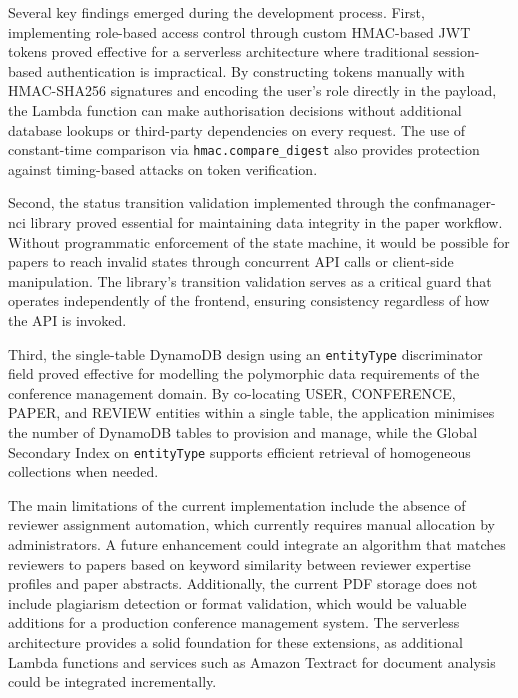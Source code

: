 \documentclass[conference]{IEEEtran}
\begin{document}
Several key findings emerged during the development process. First, implementing role-based access control through custom HMAC-based JWT tokens proved effective for a serverless architecture where traditional session-based authentication is impractical. By constructing tokens manually with HMAC-SHA256 signatures and encoding the user's role directly in the payload, the Lambda function can make authorisation decisions without additional database lookups or third-party dependencies on every request. The use of constant-time comparison via \texttt{hmac.compare\_digest} also provides protection against timing-based attacks on token verification.

Second, the status transition validation implemented through the confmanager-nci library proved essential for maintaining data integrity in the paper workflow. Without programmatic enforcement of the state machine, it would be possible for papers to reach invalid states through concurrent API calls or client-side manipulation. The library's transition validation serves as a critical guard that operates independently of the frontend, ensuring consistency regardless of how the API is invoked.

Third, the single-table DynamoDB design using an \texttt{entityType} discriminator field proved effective for modelling the polymorphic data requirements of the conference management domain. By co-locating USER, CONFERENCE, PAPER, and REVIEW entities within a single table, the application minimises the number of DynamoDB tables to provision and manage, while the Global Secondary Index on \texttt{entityType} supports efficient retrieval of homogeneous collections when needed.

The main limitations of the current implementation include the absence of reviewer assignment automation, which currently requires manual allocation by administrators. A future enhancement could integrate an algorithm that matches reviewers to papers based on keyword similarity between reviewer expertise profiles and paper abstracts. Additionally, the current PDF storage does not include plagiarism detection or format validation, which would be valuable additions for a production conference management system. The serverless architecture provides a solid foundation for these extensions, as additional Lambda functions and services such as Amazon Textract for document analysis could be integrated incrementally.
\end{document}
